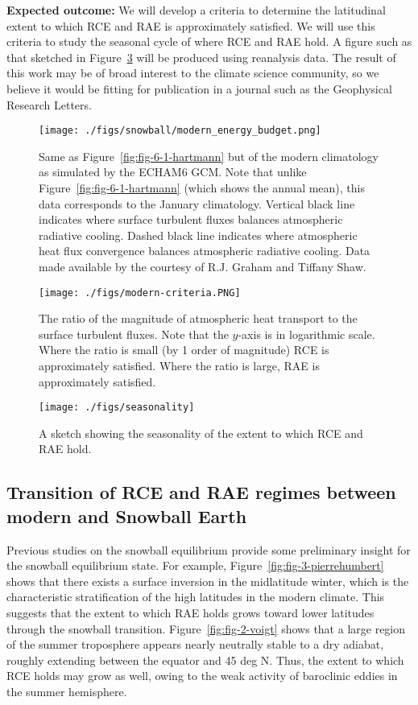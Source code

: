\documentclass{article}
\begin{document}
\textbf{Expected outcome:} We will develop a criteria to determine the latitudinal extent to which RCE and RAE is approximately satisfied. We will use this criteria to study the seasonal cycle of where RCE and RAE hold. A figure such as that sketched in Figure~\ref{fig:seasonality} will be produced using reanalysis data. The result of this work may be of broad interest to the climate science community, so we believe it would be fitting for publication in a journal such as the Geophysical Research Letters.

\begin{figure}
\centering
\texttt{[image: ./figs/snowball/modern\_energy\_budget.png]}
\caption{Same as Figure~\ref{fig:fig-6-1-hartmann} but of the modern climatology as simulated by the ECHAM6 GCM. Note that unlike Figure~\ref{fig:fig-6-1-hartmann} (which shows the annual mean), this data corresponds to the January climatology. Vertical black line indicates where surface turbulent fluxes balances atmospheric radiative cooling. Dashed black line indicates where atmospheric heat flux convergence balances atmospheric radiative cooling. Data made available by the courtesy of R.J. Graham and Tiffany Shaw.}
\label{fig:modern-budget}
\end{figure}

\begin{figure}
\centering
\texttt{[image: ./figs/modern-criteria.PNG]}
\caption{The ratio of the magnitude of atmospheric heat transport to the surface turbulent fluxes. Note that the $y$-axis is in logarithmic scale. Where the ratio is small (by 1 order of magnitude) RCE is approximately satisfied. Where the ratio is large, RAE is approximately satisfied.}
\label{fig:modern-criteria}
\end{figure}

\begin{figure}
\centering
\texttt{[image: ./figs/seasonality]}
\caption{A sketch showing the seasonality of the extent to which RCE and RAE hold.}
\label{fig:seasonality}
\end{figure}

\subsection{Transition of RCE and RAE regimes between modern and Snowball Earth}

Previous studies on the snowball equilibrium provide some preliminary insight for the snowball equilibrium state. For example, Figure~\ref{fig:fig-3-pierrehumbert} shows that there exists a surface inversion in the midlatitude winter, which is the characteristic stratification of the high latitudes in the modern climate. This suggests that the extent to which RAE holds grows toward lower latitudes through the snowball transition. Figure~\ref{fig:fig-2-voigt} shows that a large region of the summer troposphere appears nearly neutrally stable to a dry adiabat, roughly extending between the equator and 45 deg N. Thus, the extent to which RCE holds may grow as well, owing to the weak activity of baroclinic eddies in the summer hemisphere.
\end{document}
